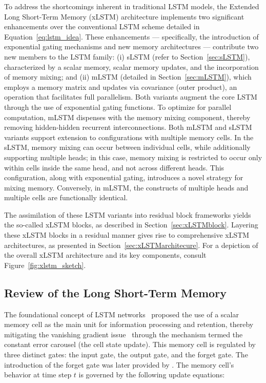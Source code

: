 To address the shortcomings inherent in traditional LSTM models, the Extended Long Short-Term Memory (xLSTM) architecture implements two significant enhancements over the conventional LSTM scheme detailed in Equation~\eqref{eq:lstm_idea}. These enhancements — specifically, the introduction of exponential gating mechanisms and new memory architectures — contribute two new members to the LSTM family: (i) sLSTM (refer to Section~\ref{sec:sLSTM}), characterized by a scalar memory, scalar memory updates, and the incorporation of memory mixing; and (ii) mLSTM (detailed in Section~\ref{sec:mLSTM}), which employs a memory matrix and updates via covariance (outer product), an operation that facilitates full parallelism. Both variants augment the core LSTM through the use of exponential gating functions. To optimize for parallel computation, mLSTM dispenses with the memory mixing component, thereby removing hidden-hidden recurrent interconnections. Both mLSTM and sLSTM variants support extension to configurations with multiple memory cells. In the sLSTM, memory mixing can occur between individual cells, while additionally supporting multiple heads; in this case, memory mixing is restricted to occur only within cells inside the same head, and not across different heads. This configuration, along with exponential gating, introduces a novel strategy for mixing memory. Conversely, in mLSTM, the constructs of multiple heads and multiple cells are functionally identical.

The assimilation of these LSTM variants into residual block frameworks yields the so-called xLSTM blocks, as described in Section~\ref{sec:xLSTMblock}. Layering these xLSTM blocks in a residual manner gives rise to comprehensive xLSTM architectures, as presented in Section~\ref{sec:xLSTMarchitecure}. For a depiction of the overall xLSTM architecture and its key components, consult Figure~\ref{fig:xlstm_sketch}.

\subsection{Review of the Long Short-Term Memory}
\label{sec:orgLSTM}

The foundational concept of LSTM networks~\citep{Hochreiter:91,Hochreiter:97nips,Hochreiter:97} proposed the use of a scalar memory cell as the main unit for information processing and retention, thereby mitigating the vanishing gradient issue~\citep{Hochreiter:91,Hochreiter:00book} through the mechanism termed the constant error carousel (the cell state update). This memory cell is regulated by three distinct gates: the input gate, the output gate, and the forget gate. The introduction of the forget gate was later provided by \citet{Gers:00}. The memory cell's behavior at time step $t$ is governed by the following update equations:

